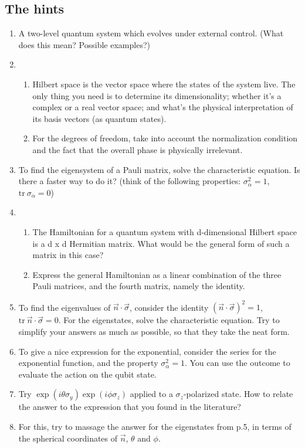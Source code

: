 \documentclass[11pt, a4paper, tightenlines, notitlepage]{revtex4-1}
\begin{document}
\subsection*{The hints}

\begin{enumerate}

\item A two-level quantum system which evolves under external control. (What does this mean? Possible examples?)

\item
\begin{enumerate}\item Hilbert space is the vector space where the states of the system live. The only thing you need is to determine its dimensionality; whether it's a complex or a real vector space; and what's the physical interpretation of its basis vectors (as quantum states).
\item For the degrees of freedom, take into account the normalization condition and the fact that the overall phase is physically irrelevant.
\end{enumerate}

\item To find the eigensystem of a Pauli matrix, solve the characteristic equation. Is there a faster way to do it? (think of the following properties: $\sigma^2_\alpha=1$, $\mathrm{tr}~ \sigma_\alpha=0$)

\item
\begin{enumerate}
\item The Hamiltonian for a quantum system with d-dimensional Hilbert space is a d x d Hermitian matrix. What would be the general form of such a matrix in this case?
\item Express the general Hamiltonian as a linear combination of the three Pauli matrices, and the fourth matrix, namely the identity.	
\end{enumerate} 


\item To find the eigenvalues of $\vec{n}\cdot\vec{\sigma}$, consider the identity $(\vec{n}\cdot\vec{\sigma})^2=1$, $\mathrm{tr}~\vec{n}\cdot\vec{\sigma}=0$. For the eigenstates, solve the characteristic equation. Try to simplify your answers as much as possible, so that they take the neat form.

\item To give a nice expression for the exponential, consider the series for the exponential function, and the property $\sigma^2_\alpha=1$. You can use the outcome to evaluate the action on the qubit state.

\item Try $\exp(i\theta\sigma_y)\exp(i\phi\sigma_z)$ applied to a $\sigma_z$-polarized state. How to relate the answer to the expression that you found in the literature?

\item For this, try to massage the answer for the eigenstates from p.5, in terms of the spherical coordinates of $\vec{n}$, $\theta$ and $\phi$.	
\end{enumerate}
\end{document}
